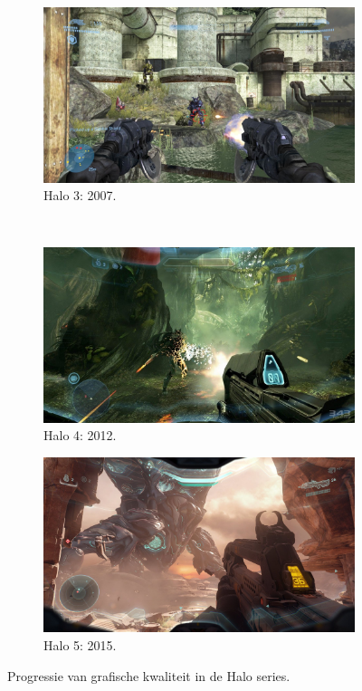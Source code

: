 \begin{figure}[t]
\begin{subfigure}[b]{0.356\textwidth}
    \includegraphics[width=\textwidth]{./img/raw/intro-halo/halo_3.png}
    \caption{Halo 3: 2007.}
    \label{fig:intro-halo:3}
  \end{subfigure}\\
  \begin{subfigure}[b]{0.45\textwidth}
    \includegraphics[width=\textwidth]{./img/raw/intro-halo/halo_4.jpg}
    \caption{Halo 4: 2012.}
    \label{fig:intro-halo:4}
  \end{subfigure} \quad
  \begin{subfigure}[b]{0.45\textwidth}
    \includegraphics[width=\textwidth]{./img/raw/intro-halo/halo_5.jpg}
    \caption{Halo 5: 2015.}
    \label{fig:intro-halo:5}
  \end{subfigure}
  \caption{Progressie van grafische kwaliteit in de Halo series.}
  \label{fig:intro-halo}
\end{figure}
